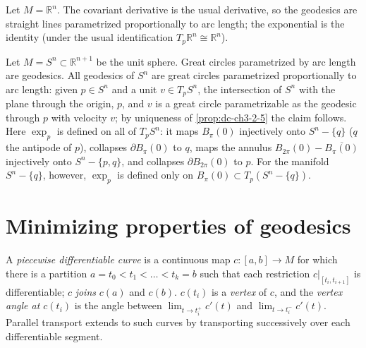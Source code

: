 \begin{example}
  \label{ex:dc-ch3-2-10}
  \leanok
  \notready
  Let $M=\mathbb{R}^n$. The covariant derivative is the usual derivative, so the
  geodesics are straight lines parametrized proportionally to arc length; the
  exponential is the identity (under the usual identification $T_p\mathbb{R}^n\cong\mathbb{R}^n$).
\end{example}

\begin{example}
  \label{ex:dc-ch3-2-11}
  \notready
  \notready
  Let $M=S^n\subset\mathbb{R}^{n+1}$ be the unit sphere. Great circles
  parametrized by arc length are geodesics. All
  geodesics of $S^n$ are great circles parametrized proportionally to arc length:
  given $p\in S^n$ and a unit $v\in T_pS^n$, the intersection of $S^n$ with the
  plane through the origin, $p$, and $v$ is a great circle parametrizable as the
  geodesic through $p$ with velocity $v$; by uniqueness of \cref{prop:dc-ch3-2-5} the claim
  follows. Here $\exp_p$ is defined on all of $T_p S^n$: it maps $B_\pi(0)$
  injectively onto $S^n-\{q\}$ ($q$ the antipode of $p$), collapses
  $\partial B_\pi(0)$ to $q$, maps the annulus $B_{2\pi}(0)-\overline{B_\pi(0)}$
  injectively onto $S^n-\{p,q\}$, and collapses $\partial B_{2\pi}(0)$ to $p$.
  For the manifold $S^n-\{q\}$, however, $\exp_p$ is defined only on
  $B_\pi(0)\subset T_p(S^n-\{q\})$.
\end{example}

\section{Minimizing properties of geodesics}

\begin{definition}
  \label{def:dc-ch3-3-1}
  A \emph{piecewise differentiable curve} is a continuous map $c:[a,b]\to M$ for which
  there is a partition $a=t_0<t_1<\dots<t_k=b$ such that each restriction
  $c|_{[t_i,t_{i+1}]}$ is differentiable; $c$ \emph{joins} $c(a)$ and $c(b)$. $c(t_i)$ is
  a \emph{vertex} of $c$, and the \emph{vertex angle at $c(t_i)$} is the angle between
  $\lim_{t\to t_i^+}c'(t)$ and $\lim_{t\to t_i^-}c'(t)$. Parallel transport extends
  to such curves by transporting successively over each differentiable segment.
\end{definition}

